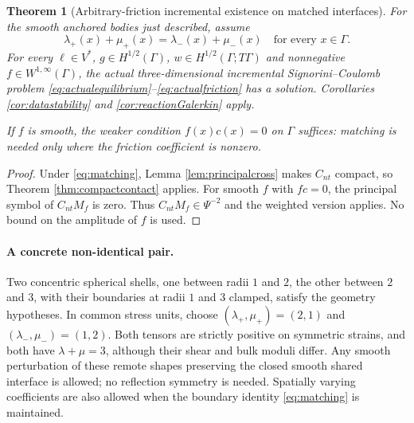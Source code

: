 \documentclass[11pt,a4paper]{article}
\newtheorem{theorem}{Theorem}[section]
\theoremstyle{definition}\newtheorem{definition}[theorem]{Definition}
\theoremstyle{remark}\newtheorem{remark}[theorem]{Remark}
\numberwithin{equation}{section}
\begin{document}
\begin{theorem}[Arbitrary-friction incremental existence on matched interfaces]\label{thm:matchedexistence}
For the smooth anchored bodies just described, assume
\begin{equation}\label{eq:matching}
 \lambda_+(x)+\mu_+(x)=\lambda_-(x)+\mu_-(x)
       \quad\text{for every }x\in\Gamma.
\end{equation}
For every $\ell\in V^*$, $g\in H^{1/2}(\Gamma)$, $w\in H^{1/2}(\Gamma;T\Gamma)$ and nonnegative $f\in W^{1,\infty}(\Gamma)$, the actual three-dimensional incremental Signorini--Coulomb problem \eqref{eq:actualequilibrium}--\eqref{eq:actualfriction} has a solution. Corollaries \ref{cor:datastability} and \ref{cor:reactionGalerkin} apply.

If $f$ is smooth, the weaker condition $f(x)c(x)=0$ on $\Gamma$ suffices: matching is needed only where the friction coefficient is nonzero.
\end{theorem}
\begin{proof}
Under \eqref{eq:matching}, Lemma \ref{lem:principalcross} makes $C_{nt}$ compact, so Theorem \ref{thm:compactcontact} applies. For smooth $f$ with $fc=0$, the principal symbol of $C_{nt}M_f$ is zero. Thus $C_{nt}M_f\in\Psi^{-2}$ and the weighted version applies. No bound on the amplitude of $f$ is used.
\end{proof}

\paragraph{A concrete non-identical pair.}
Two concentric spherical shells, one between radii $1$ and $2$, the other between $2$ and $3$, with their boundaries at radii $1$ and $3$ clamped, satisfy the geometry hypotheses. In common stress units, choose $(\lambda_+,\mu_+)=(2,1)$ and $(\lambda_-,\mu_-)=(1,2)$. Both tensors are strictly positive on symmetric strains, and both have $\lambda+\mu=3$, although their shear and bulk moduli differ. Any smooth perturbation of these remote shapes preserving the closed smooth shared interface is allowed; no reflection symmetry is needed. Spatially varying coefficients are also allowed when the boundary identity \eqref{eq:matching} is maintained.
\end{document}
